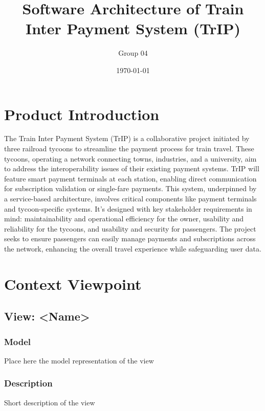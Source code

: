 \documentclass{article}
\title{Software Architecture of Train Inter Payment System (TrIP)}
\author{Group 04}
\date{\today}
\begin{document}
\maketitle
\newpage

\section*{Product Introduction}
The Train Inter Payment System (TrIP) is a collaborative project initiated by three railroad tycoons to streamline the payment process for train travel. These tycoons, operating a network connecting towns, industries, and a university, aim to address the interoperability issues of their existing payment systems. TrIP will feature smart payment terminals at each station, enabling direct communication for subscription validation or single-fare payments. This system, underpinned by a service-based architecture, involves critical components like payment terminals and tycoon-specific systems. It's designed with key stakeholder requirements in mind: maintainability and operational efficiency for the owner, usability and reliability for the tycoons, and usability and security for passengers. The project seeks to ensure passengers can easily manage payments and subscriptions across the network, enhancing the overall travel experience while safeguarding user data.

\newpage

\newpage


\newpage

\newpage

\newpage

\newpage


% 

\section*{Context Viewpoint}
\subsection*{View: \textless{}Name\textgreater{}}
\subsubsection*{Model}
Place here the model representation of the view

\subsubsection*{Description}
Short description of the view
\end{document}
